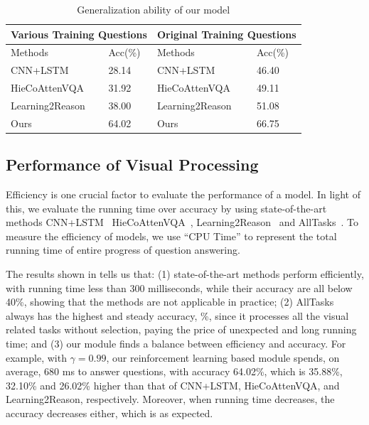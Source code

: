 \begin{table}[h]
	\small
	\begin{tabular}{|l|l||l|l|}
		\hline
		\multicolumn{2}{|l||}{Various Training Questions} & \multicolumn{2}{l|}{Original Training Questions} \\ \hline \hline
		Methods                  & Acc(\%)            & Methods                   & Acc(\%)             \\ \hline
		CNN+LSTM                    & 28.14              & CNN+LSTM                     & 46.40               \\ \hline
		HieCoAttenVQA               & 31.92              & HieCoAttenVQA                & 49.11               \\ \hline
		Learning2Reason             & 38.00              & Learning2Reason              & 51.08               \\ \hline
		Ours                        & 64.02              & Ours                         & 66.75               \\ \hline
	\end{tabular}
	\caption{Generalization ability of our model} \label{table:genralization}
\end{table}


\subsection{Performance of Visual Processing}

Efficiency is one crucial factor to evaluate the performance of a \vqa model. 
In light of this, we evaluate the running time over accuracy by using state-of-the-art methods CNN+LSTM~\cite{VQA} HieCoAttenVQA~\cite{Lu2016Hie}, Learning2Reason~\cite{hu2017learning} and AllTasks~\cite{peixi2019}. To measure the efficiency of \vqa models, we use ``CPU Time'' to represent the total running time of entire progress of question answering. 

The results shown in  tells us that: (1) state-of-the-art methods perform efficiently, with running time less than 300 milliseconds, while their accuracy are all below 40\%, showing that the methods are not applicable in practice; (2) AllTasks always has the highest and steady accuracy, \%, since it processes all the visual related tasks without selection, paying the price of unexpected and long running time; and (3) our module finds a balance between efficiency and accuracy. For example, with $\gamma=0.99$, our reinforcement learning based module spends, on average, 680 ms to answer questions, with accuracy 64.02\%, which is 35.88\%, 32.10\% and 26.02\% higher than that of CNN+LSTM, HieCoAttenVQA, and Learning2Reason, respectively. Moreover, when running time decreases, the accuracy decreases either, which is as expected.

